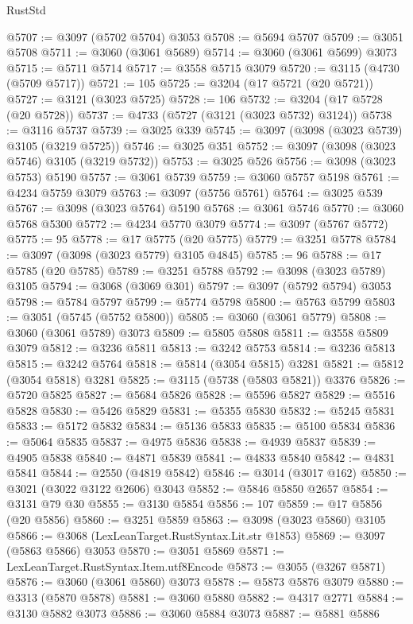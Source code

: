 \begin{lexlean}{RustStd}
\begin{coremodule}
@5707 := @3097 (@5702 @5704) @3053
@5708 := @5694 @5707
@5709 := @3051 @5708
@5711 := @3060 (@3061 @5689)
@5714 := @3060 (@3061 @5699) @3073
@5715 := @5711 @5714
@5717 := @3558 @5715 @3079
@5720 := @3115 (@4730 (@5709 @5717))
@5721 := 105
@5725 := @3204 (@17 @5721 (@20 @5721))
@5727 := @3121 (@3023 @5725)
@5728 := 106
@5732 := @3204 (@17 @5728 (@20 @5728))
@5737 := @4733 (@5727 (@3121 (@3023 @5732) @3124))
@5738 := @3116 @5737
@5739 := @3025 @339
@5745 := @3097 (@3098 (@3023 @5739) @3105 (@3219 @5725))
@5746 := @3025 @351
@5752 := @3097 (@3098 (@3023 @5746) @3105 (@3219 @5732))
@5753 := @3025 @526
@5756 := @3098 (@3023 @5753) @5190
@5757 := @3061 @5739
@5759 := @3060 @5757 @5198
@5761 := @4234 @5759 @3079
@5763 := @3097 (@5756 @5761)
@5764 := @3025 @539
@5767 := @3098 (@3023 @5764) @5190
@5768 := @3061 @5746
@5770 := @3060 @5768 @5300
@5772 := @4234 @5770 @3079
@5774 := @3097 (@5767 @5772)
@5775 := 95
@5778 := @17 @5775 (@20 @5775)
@5779 := @3251 @5778
@5784 := @3097 (@3098 (@3023 @5779) @3105 @4845)
@5785 := 96
@5788 := @17 @5785 (@20 @5785)
@5789 := @3251 @5788
@5792 := @3098 (@3023 @5789) @3105
@5794 := @3068 (@3069 @301)
@5797 := @3097 (@5792 @5794) @3053
@5798 := @5784 @5797
@5799 := @5774 @5798
@5800 := @5763 @5799
@5803 := @3051 (@5745 (@5752 @5800))
@5805 := @3060 (@3061 @5779)
@5808 := @3060 (@3061 @5789) @3073
@5809 := @5805 @5808
@5811 := @3558 @5809 @3079
@5812 := @3236 @5811
@5813 := @3242 @5753
@5814 := @3236 @5813
@5815 := @3242 @5764
@5818 := @5814 (@3054 @5815) @3281
@5821 := @5812 (@3054 @5818) @3281
@5825 := @3115 (@5738 (@5803 @5821)) @3376
@5826 := @5720 @5825
@5827 := @5684 @5826
@5828 := @5596 @5827
@5829 := @5516 @5828
@5830 := @5426 @5829
@5831 := @5355 @5830
@5832 := @5245 @5831
@5833 := @5172 @5832
@5834 := @5136 @5833
@5835 := @5100 @5834
@5836 := @5064 @5835
@5837 := @4975 @5836
@5838 := @4939 @5837
@5839 := @4905 @5838
@5840 := @4871 @5839
@5841 := @4833 @5840
@5842 := @4831 @5841
@5844 := @2550 (@4819 @5842)
@5846 := @3014 (@3017 @162)
@5850 := @3021 (@3022 @3122 @2606) @3043
@5852 := @5846 @5850 @2657
@5854 := @3131 @79 @30
@5855 := @3130 @5854
@5856 := 107
@5859 := @17 @5856 (@20 @5856)
@5860 := @3251 @5859
@5863 := @3098 (@3023 @5860) @3105
@5866 := @3068 (LexLeanTarget.RustSyntax.Lit.str @1853)
@5869 := @3097 (@5863 @5866) @3053
@5870 := @3051 @5869
@5871 := LexLeanTarget.RustSyntax.Item.utf8Encode
@5873 := @3055 (@3267 @5871)
@5876 := @3060 (@3061 @5860) @3073
@5878 := @5873 @5876 @3079
@5880 := @3313 (@5870 @5878)
@5881 := @3060 @5880
@5882 := @4317 @2771
@5884 := @3130 @5882 @3073
@5886 := @3060 @5884 @3073
@5887 := @5881 @5886

\end{coremodule}
\end{lexlean}
